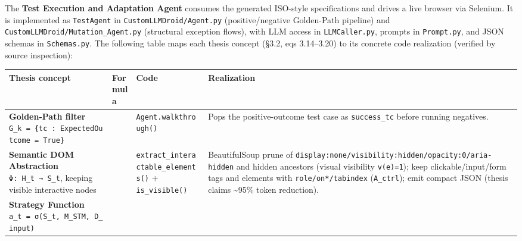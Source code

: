 \documentclass[
]{article}
\newcounter{none} %
\begin{document}
The \textbf{Test Execution and Adaptation Agent} consumes the generated
ISO-style specifications and drives a live browser via Selenium. It is
implemented as \texttt{TestAgent} in \texttt{CustomLLMDroid/Agent.py}
(positive/negative Golden-Path pipeline) and
\texttt{CustomLLMDroid/Mutation\_Agent.py} (structural exception flows),
with LLM access in \texttt{LLMCaller.py}, prompts in \texttt{Prompt.py},
and JSON schemas in \texttt{Schemas.py}. The following table maps each
thesis concept (§3.2, eqs 3.14--3.20) to its concrete code realization
(verified by source inspection):

{\def\LTcaptype{none} %
\begin{longtable}[]{@{}
  >{\raggedright\arraybackslash}p{}
  >{\raggedright\arraybackslash}p{}
  >{\raggedright\arraybackslash}p{}
  >{\raggedright\arraybackslash}p{}@{}}
\toprule\noalign{}
\begin{minipage}[b]{\linewidth}\raggedright
Thesis concept
\end{minipage} & \begin{minipage}[b]{\linewidth}\raggedright
Formula
\end{minipage} & \begin{minipage}[b]{\linewidth}\raggedright
Code
\end{minipage} & \begin{minipage}[b]{\linewidth}\raggedright
Realization
\end{minipage} \\
\midrule\noalign{}
\endhead
\bottomrule\noalign{}
\endlastfoot
\textbf{Golden-Path filter}
\texttt{G\_k\ =\ \{tc\ :\ ExpectedOutcome\ =\ True\}} & 3.14 &
\texttt{Agent.walkthrough()} & Pops the positive-outcome test case as
\texttt{success\_tc} before running negatives. \\
\textbf{Semantic DOM Abstraction} \texttt{Φ:\ H\_t\ →\ S\_t}, keeping
visible interactive nodes & 3.15 &
\texttt{extract\_interactable\_elements()} + \texttt{is\_visible()} &
BeautifulSoup prune of
\texttt{display:none/visibility:hidden/opacity:0/aria-hidden} and hidden
ancestors (visual visibility \texttt{v(e)=1}); keep clickable/input/form
tags and elements with \texttt{role/on*/tabindex} (\texttt{A\_ctrl});
emit compact JSON (thesis claims \textasciitilde95\% token
reduction). \\
\textbf{Strategy Function} \texttt{a\_t\ =\ σ(S\_t,\ M\_STM,\ D\_input)}

\end{longtable}}
\end{document}
